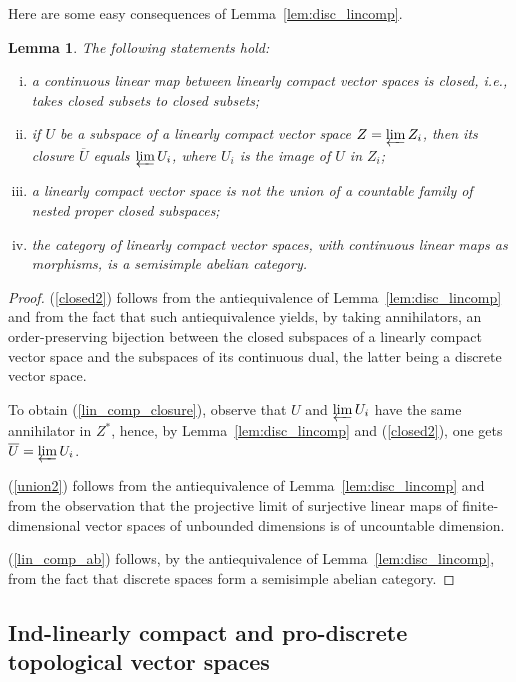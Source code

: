 \documentclass[12pt,reqno]{amsart}
\newtheorem{lem}[thm]{Lemma}
\theoremstyle{definition}
\theoremstyle{remark}
\begin{document}
	Here are some easy consequences of Lemma~\ref{lem:disc_lincomp}.
	
	\begin{lem}\label{lem:lc}
	    The following statements hold:
	    \begin{enumerate}[(i)]
	        \item \label{closed2} a continuous linear map between linearly compact vector spaces is closed, i.e., takes closed subsets to closed subsets;
	        \item \label{lin_comp_closure} if $U$ be a subspace of a linearly compact vector space $Z = \varprojlim Z_i$, then its closure $\overline{U}$ equals $\varprojlim U_i$, where $U_i$ is the image of $U$ in $Z_i$;
	        \item \label{union2} a linearly compact vector space is not the union of a countable family of nested proper closed subspaces;
	        \item \label{lin_comp_ab} the category of linearly compact vector spaces, with continuous linear maps as morphisms, is a semisimple abelian category.
	    \end{enumerate}
	\end{lem}
	
	\begin{proof}
	    (\ref{closed2}) follows from the antiequivalence of Lemma~\ref{lem:disc_lincomp} and from the fact that such antiequivalence yields, by taking annihilators, an order-preserving  bijection between the closed subspaces of a linearly compact vector space and the subspaces of its continuous dual, the latter being a discrete vector space.
	    
	    To obtain (\ref{lin_comp_closure}), observe that $U$ and $\varprojlim U_i$ have the same annihilator in $Z^\ast$, hence, by Lemma~\ref{lem:disc_lincomp} and (\ref{closed2}), one gets $\overline{U}=\varprojlim U_i$.
	    
	    (\ref{union2}) follows from the antiequivalence of Lemma~\ref{lem:disc_lincomp} and from the observation that the projective limit of surjective linear maps of finite-dimensional vector spaces of unbounded dimensions is of uncountable dimension.
	    
	    (\ref{lin_comp_ab}) follows, by the antiequivalence of Lemma~\ref{lem:disc_lincomp}, from the fact that discrete spaces form a semisimple abelian category.
	\end{proof}
	
	\subsection{Ind-linearly compact and pro-discrete topological vector spaces}
	
\end{document}
